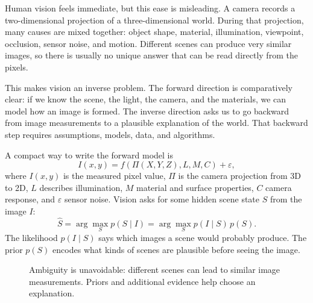 \noindent
Human vision feels immediate, but this ease is misleading. A camera records a
two-dimensional projection of a three-dimensional world. During that projection,
many causes are mixed together: object shape, material, illumination, viewpoint,
occlusion, sensor noise, and motion. Different scenes can produce very similar
images, so there is usually no unique answer that can be read directly from the
pixels.

This makes vision an inverse problem. The forward direction is comparatively
clear: if we know the scene, the light, the camera, and the materials, we can
model how an image is formed. The inverse direction asks us to go backward from
image measurements to a plausible explanation of the world. That backward step
requires assumptions, models, data, and algorithms.

A compact way to write the forward model is
\begin{equation}
  I(x,y) = f\!\left(\Pi(X,Y,Z), L, M, C\right) + \varepsilon ,
\end{equation}
\noindent
where $I(x,y)$ is the measured pixel value, $\Pi$ is the camera projection from
3D to 2D, $L$ describes illumination, $M$ material and surface properties, $C$
camera response, and $\varepsilon$ sensor noise. Vision asks for some hidden
scene state $S$ from the image $I$:
\begin{equation}
  \hat{S} = \arg\max_S p(S \mid I)
  = \arg\max_S p(I \mid S)\,p(S).
\end{equation}
\noindent
The likelihood $p(I \mid S)$ says which images a scene would probably produce.
The prior $p(S)$ encodes what kinds of scenes are plausible before seeing the
image.

\begin{figure}[ht]
  \centering
  \caption{Ambiguity is unavoidable: different scenes can lead to similar image
  measurements. Priors and additional evidence help choose an explanation.}
\end{figure}

